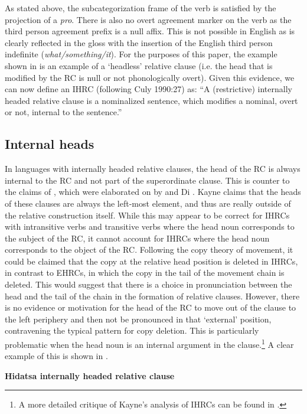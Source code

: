 \documentclass[output=paper]{LSP/langsci}
\begin{document}
As stated above, the subcategorization frame of the verb is satisfied by the projection of a \textit{pro}. There is also no overt agreement marker on the verb as the third person agreement prefix is a null affix. This is not possible in English as is clearly reflected in the gloss with the insertion of the English third person indefinite (\textit{what/something/it}). For the purposes of this paper, the example shown in  is an example of a `headless' relative clause (i.e. the head that is modified by the RC is null or not phonologically overt). Given this evidence, we can now define an IHRC (following Culy 1990:27) as: ``A (restrictive) internally headed relative clause is a nominalized sentence, which modifies a nominal, overt or not, internal to the sentence.'' 

\subsection{Internal heads}

In languages with internally headed relative clauses, the head of the RC is always internal to the RC and not part of the superordinate clause. This is counter to the claims of \citet{Kayne1994}, which were elaborated on by \citet{Bianchi1999} and Di \citet{Sciullo2005}. Kayne claims that the heads of these clauses are always the left-most element, and thus are really outside of the relative construction itself.  While this may appear to be correct for IHRCs with intransitive verbs and transitive verbs where the head noun corresponds to the subject of the RC, it cannot account for IHRCs where the head noun corresponds to the object of the RC. Following the copy theory of movement, it could be claimed that the copy at the relative head position is deleted in IHRCs, in contrast to EHRCs, in which the copy in the tail of the movement chain is deleted. This would suggest that there is a choice in pronunciation between the head and the tail of the chain in the formation of relative clauses. However, there is no evidence or motivation for the head of the RC to move out of the clause to the left periphery and then not be pronounced in that `external' position, contravening the typical pattern for copy deletion. This is particularly problematic when the head noun is an internal argument in the clause.\footnote{A more detailed critique of Kayne's analysis of IHRCs can be found in \citet{Boyle2007}.}  A clear example of this is shown in .

\ea \textbf{Hidatsa internally headed relative clause} \label{boyle11}
\end{document}
